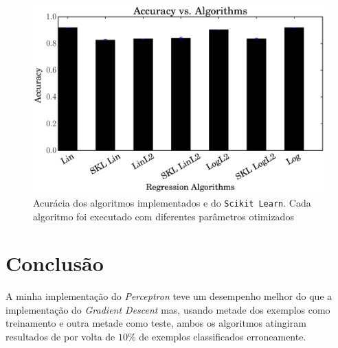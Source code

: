 \documentclass[a4paper, 12pt]{article}
\begin{document}
\begin{figure}[htpb]
    \centering
    \includegraphics[width=.8\textwidth]{acc_vs_algorithm}
    \caption{Acurácia dos algoritmos implementados e do
    \texttt{Scikit Learn}. Cada algoritmo foi executado
    com diferentes parâmetros otimizados}
    \label{fig:algorithm}
\end{figure}

\section{Conclusão} \label{sec:concl}

A minha implementação do \textit{Perceptron} teve um desempenho melhor do que a
implementação do \textit{Gradient Descent} mas, usando metade dos exemplos como
treinamento e outra metade como teste, ambos os algoritmos atingiram resultados
de por volta de $10\%$ de exemplos classificados erroneamente.
\end{document}
